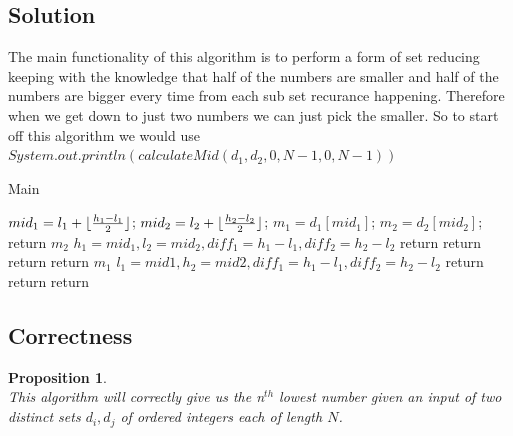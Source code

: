 \documentclass[12pt]{article}
\newtheorem{proposition}[theorem]{Proposition}
\DeclarePairedDelimiter{\floor}{\lfloor}{\rfloor}
\begin{document}

\subsection{Solution}
The main functionality of this algorithm is to perform a form of set reducing keeping with the knowledge that half
of the numbers are smaller and half of the numbers are bigger every time from each sub set recurance happening.
Therefore when we get down to just two numbers we can just pick the smaller. So to start off this algorithm we
would use $System.out.println(calculateMid(d_1, d_2, 0, N-1, 0, N-1))$

\begin{algorithm}[H]
\caption{Main}
\begin{algorithmic}
        \State $mid_1 = l_1 + \floor{\frac{h_1 - l_1}{2}}$; $mid_2 = l_2 + \floor{\frac{h_2 - l_2}{2}}$;
        \State $m_1 = d_1[mid_1]$; $m_2 = d_2[mid_2]$;
                \State return $m_2$
            \EndIf
            \State $h_1 = mid_1, l_2 = mid_2, diff_1 = h_1 - l_1, diff_2 = h_2 - l_2$
                \State return 
                \State return 
            \Else
                \State return 
            \EndIf
        \Else
               \State return $m_1$
           \EndIf
           \State $l_1 = mid1, h_2 = mid2, diff_1 = h_1 - l_1, diff_2 = h_2 - l_2$
               \State return 
               \State return 
           \Else
               \State return 
           \EndIf
        \EndIf
    \EndProcedure
\end{algorithmic}
\end{algorithm}



\subsection{Correctness}
\begin{proposition}
~ \\ \indent This algorithm will correctly give us the n$^{th}$ lowest number given an input of two distinct
sets $d_i, d_j$ of ordered integers each of length $N$.
\end{proposition}
\end{document}
